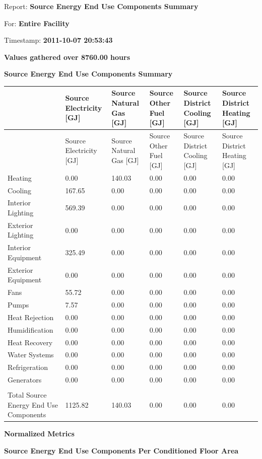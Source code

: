 Report: \textbf{Source Energy End Use Components Summary}

For: \textbf{Entire Facility}

Timestamp: \textbf{2011-10-07 20:53:43}

\textbf{Values gathered over 8760.00 hours}

\textbf{Source Energy End Use Components Summary}

\begin{longtable}[c]{>{\raggedright}p{1.0in}>{\raggedright}p{1.0in}>{\raggedright}p{1.0in}>{\raggedright}p{1.0in}>{\raggedright}p{1.0in}>{\raggedright}p{1.0in}}
\toprule
 & Source Electricity [GJ] & Source Natural Gas [GJ] & Source Other Fuel [GJ] & Source District Cooling [GJ] & Source District Heating [GJ] \tabularnewline
\midrule
\endfirsthead

\toprule
 & Source Electricity [GJ] & Source Natural Gas [GJ] & Source Other Fuel [GJ] & Source District Cooling [GJ] & Source District Heating [GJ] \tabularnewline
\midrule
\endhead

Heating & 0.00 & 140.03 & 0.00 & 0.00 & 0.00 \tabularnewline
Cooling & 167.65 & 0.00 & 0.00 & 0.00 & 0.00 \tabularnewline
Interior Lighting & 569.39 & 0.00 & 0.00 & 0.00 & 0.00 \tabularnewline
Exterior Lighting & 0.00 & 0.00 & 0.00 & 0.00 & 0.00 \tabularnewline
Interior Equipment & 325.49 & 0.00 & 0.00 & 0.00 & 0.00 \tabularnewline
Exterior Equipment & 0.00 & 0.00 & 0.00 & 0.00 & 0.00 \tabularnewline
Fans & 55.72 & 0.00 & 0.00 & 0.00 & 0.00 \tabularnewline
Pumps & 7.57 & 0.00 & 0.00 & 0.00 & 0.00 \tabularnewline
Heat Rejection & 0.00 & 0.00 & 0.00 & 0.00 & 0.00 \tabularnewline
Humidification & 0.00 & 0.00 & 0.00 & 0.00 & 0.00 \tabularnewline
Heat Recovery & 0.00 & 0.00 & 0.00 & 0.00 & 0.00 \tabularnewline
Water Systems & 0.00 & 0.00 & 0.00 & 0.00 & 0.00 \tabularnewline
Refrigeration & 0.00 & 0.00 & 0.00 & 0.00 & 0.00 \tabularnewline
Generators & 0.00 & 0.00 & 0.00 & 0.00 & 0.00 \tabularnewline
 &  &  &  &  &  \tabularnewline
Total Source Energy End Use Components & 1125.82 & 140.03 & 0.00 & 0.00 & 0.00 \tabularnewline
\bottomrule
\end{longtable}

\textbf{Normalized Metrics}

\textbf{Source Energy End Use Components Per Conditioned Floor Area}

